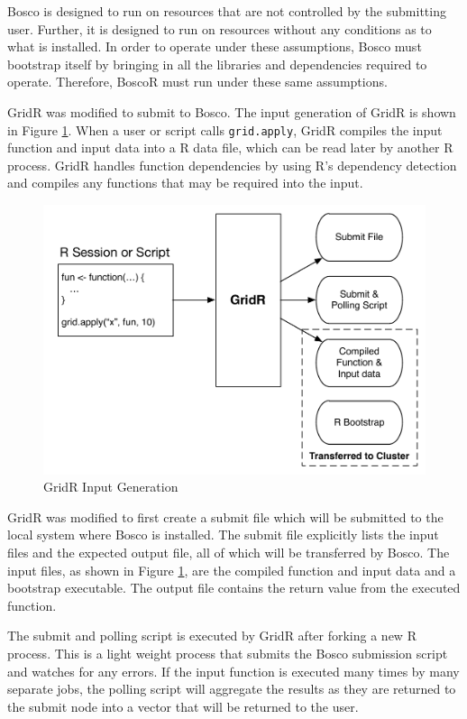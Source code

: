 Bosco is designed to run on resources that are not controlled by the submitting user.  Further, it is designed to run on resources without any conditions as to what is installed.  In order to operate under these assumptions, Bosco must bootstrap itself by bringing in all the libraries and dependencies required to operate.  Therefore, BoscoR must run under these same assumptions.

GridR was modified to submit to Bosco.  The input generation of GridR is shown in Figure \ref{fig:gridrinput}.  When a user or script calls \texttt{grid.apply}, GridR compiles the input function and input data into a R data file, which can be read later by another R process.  GridR handles function dependencies by using R's dependency detection and compiles any functions that may be required into the input.  

\begin{figure}[ht]
\centering
\includegraphics[width=\textwidth]{BoscoRImages/InputDiagram.pdf}
\caption{GridR Input Generation}
\label{fig:gridrinput}
\end{figure}

GridR was modified to first create a submit file which will be submitted to the local system where Bosco is installed.  The submit file explicitly lists the input files and the expected output file, all of which will be transferred by Bosco.  The input files, as shown in Figure \ref{fig:gridrinput}, are the compiled function and input data and a bootstrap executable.  The output file contains the return value from the executed function.

The submit and polling script is executed by GridR after forking a new R process.  This is a light weight process that submits the Bosco submission script and watches for any errors.  If the input function is executed many times by many separate jobs, the polling script will aggregate the results as they are returned to the submit node into a vector that will be returned to the user.  


